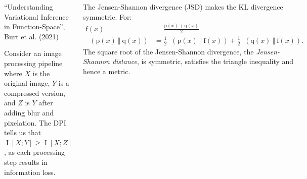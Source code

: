 \documentclass[25pt,a0paper,landscape]{tikzposter}
\begin{document}
\begin{columns}
{\begin{multicols}{2}
\begin{quotebox}
    \begin{flushright}
    ``Understanding Variational Inference in Function-Space'', \\
    Burt et al. (2021)
    \end{flushright}
  \end{quotebox}
  \begin{examplebox}[title=Example: Image Processing]
    Consider an image processing pipeline where $X$ is the original image, $Y$ is a compressed version, and $Z$ is $Y$ after adding blur and pixelation. The DPI tells us that $\mathop{\mathrm{I}}[X;Y] \ge \mathop{\mathrm{I}}[X;Z]$, as each processing step results in information loss.
  \end{examplebox}
\end{multicols}
\begin{multicols}{2}
  \begin{theorybox}[title=Jenson-Shannon Divergence DPI]
  The Jensen-Shannon divergence (JSD) makes the KL divergence symmetric. For:
  \begin{align*}
  \mathrm{f}(x) &= \frac{\mathrm{p}(x) + \mathrm{q}(x)}{2}\\
  \mathop{\mathrm{D_\mathrm{JSD}}}(\mathrm{p}(x) \:\Vert\: \mathrm{q}(x)) &= \frac{1}{2} \mathop{\mathrm{D_\mathrm{KL}}}(\mathrm{p}(x) \:\Vert\: \mathrm{f}(x)) + \frac{1}{2} \mathop{\mathrm{D_\mathrm{KL}}}(\mathrm{q}(x) \:\Vert\: \mathrm{f}(x)).
  \end{align*}
  The square root of the Jensen-Shannon divergence, the \emph{Jensen-Shannon distance}, is symmetric, satisfies the triangle inequality and hence a metric.


\end{theorybox}
\end{multicols}}
\end{columns}
\end{document}
